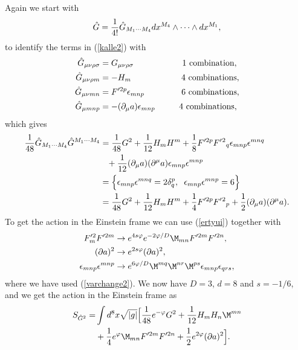Again we start with
\begin{equation}
\hat{G}={1 \over 4!}\hat{G}_{M_{1} \cdots M_{4}}dx^{M_{4}} \wedge \cdots \wedge dx^{M_{1}},
\end{equation}
to identify the terms in (\ref{kalle2}) with
\begin{align}
\hat{G}_{\mu \nu \rho \sigma}&=G_{\mu \nu \rho \sigma} \hspace{2.03cm} \mbox{1 combination}, \nonumber \\
\hat{G}_{\mu \nu \rho m}&=-H_m \hspace{2.1cm} \mbox{4 combinations}, \nonumber \\
\hat{G}_{\mu \nu mn}&=F'^{2p} {\epsilon}_{mnp} \hspace{1.55cm} \mbox{6 combinations}, \nonumber \\
\hat{G}_{\mu mnp}&=-({\partial}_{\mu}a){\epsilon}_{mnp} \hspace{1cm} \mbox{4 combinations},
\end{align}
which gives
\begin{align}
{1 \over 48}\hat{G}_{M_{1} \cdots M_{4}} \hat{G}^{M_{1} \cdots M_{4}}&={1 \over 48}G^2 + {1 \over 12}H_m H^m + {1 \over 8}F'^{2p} F'{^2}_q {\epsilon}_{mnp} {\epsilon}^{mnq} \nonumber \\
&\phantom{=}+ {1 \over 12}({\partial}_{\mu}a)({\partial}^{\mu}a){\epsilon}_{mnp}{\epsilon}^{mnp} \nonumber \\
&= \Big{\{} {\epsilon}_{mnp} {\epsilon}^{mnq} = 2\delta^{p}_q ,\hspace{0.2cm} {\epsilon}_{mnp}{\epsilon}^{mnp} = 6 \Big{\}} \nonumber \\
&= {1 \over 48}G^2 + {1 \over 12}H_m H^m + {1 \over 4}F'^{2p} F'{^2}_p + {1 \over 2}({\partial}_{\mu}a)({\partial}^{\mu}a).
\end{align}
To get the action in the Einstein frame we can use (\ref{ertyui}) together with
\begin{align}
F'^2_m F'^{2m} &\rightarrow e^{4s \varphi}e^{-2\varphi /D}\M_{mn}F'^{2m}F'^{2n}, \nonumber \\
(\partial a)^2 &\rightarrow e^{2s\varphi} (\partial a)^2, \nonumber \\
{\epsilon}_{mnp}{\epsilon}^{mnp} &\rightarrow e^{6\varphi /D}\M^{mq}\M^{nr}\M^{ps} {\epsilon}_{mnp}{\epsilon}_{qrs},
\end{align}
where we have used (\ref{varchange2}). We now have $D=3$, $d=8$ and $s=-1/6$, and we get the action in the Einstein frame as
\begin{align}
S_{\hat G^2} =& \int d^8x \sqrt{|g|} \Big{[} {1 \over 48}e^{-\varphi}G^2 + {1 \over 12}H_mH_n\M^{mn} \nonumber \\
&+ {1 \over 4}e^{\varphi}\M_{mn}F'^{2m}F'^{2n} + {1 \over 2}e^{2\varphi}(\partial a)^2 \Big{]}.
\end{align}
